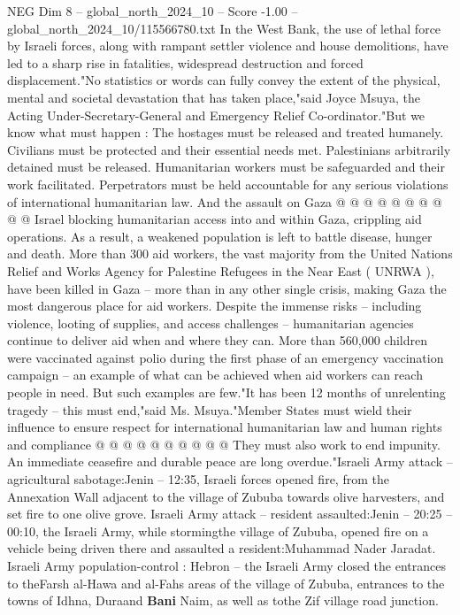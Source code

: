 \begin{textsample}{NEG Dim 8 – global\_north\_2024\_10 – Score -1.00 – global\_north\_2024\_10/115566780.txt}
In the West Bank, the use of lethal force by Israeli forces, along with rampant settler violence and house demolitions, have led to a sharp rise in fatalities, widespread destruction and forced displacement."No statistics or words can fully convey the extent of the physical, mental and societal devastation that has taken place,"said Joyce Msuya, the Acting Under-Secretary-General and Emergency Relief Co-ordinator."But we know what must happen : The hostages must be released and treated humanely.
Civilians must be protected and their essential needs met.
Palestinians arbitrarily detained must be released.
Humanitarian workers must be safeguarded and their work facilitated.
Perpetrators must be held accountable for any serious violations of international humanitarian law.
And the assault on Gaza @ @ @ @ @ @ @ @ @ @ Israel blocking humanitarian access into and within Gaza, crippling aid operations.
As a result, a weakened population is left to battle disease, hunger and death.
More than 300 aid workers, the vast majority from the United Nations Relief and Works Agency for Palestine Refugees in the Near East ( UNRWA ), have been killed in Gaza -- more than in any other single crisis, making Gaza the most dangerous place for aid workers.
Despite the immense risks -- including violence, looting of supplies, and access challenges -- humanitarian agencies continue to deliver aid when and where they can.
More than 560,000 children were vaccinated against polio during the first phase of an emergency vaccination campaign -- an example of what can be achieved when aid workers can reach people in need.
But such examples are few."It has been 12 months of unrelenting tragedy -- this must end,"said Ms.
Msuya."Member States must wield their influence to ensure respect for international humanitarian law and human rights and compliance @ @ @ @ @ @ @ @ @ @ They must also work to end impunity.
An immediate ceasefire and durable peace are long overdue."Israeli Army attack -- agricultural sabotage:Jenin -- 12:35, Israeli forces opened fire, from the Annexation Wall adjacent to the village of Zububa towards olive harvesters, and set fire to one olive grove.
Israeli Army attack -- resident assaulted:Jenin -- 20:25 -- 00:10, the Israeli Army, while stormingthe village of Zububa, opened fire on a vehicle being driven there and assaulted a resident:Muhammad Nader Jaradat.
Israeli Army population-control : Hebron -- the Israeli Army closed the entrances to theFarsh al-Hawa and al-Fahs areas of the village of Zububa, entrances to the towns of Idhna, Duraand \textbf{Bani} Naim, as well as tothe Zif village road junction.

\end{textsample}
